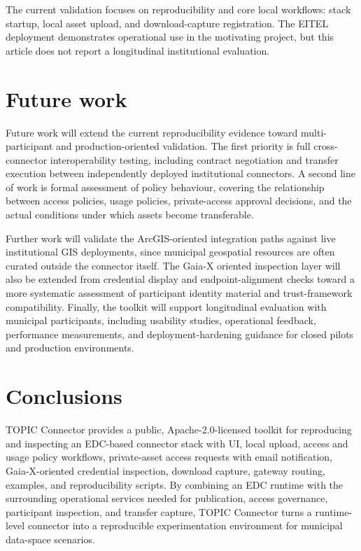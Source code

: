 \documentclass[a4paper,fleqn]{cas-dc}
\begin{document}
The current validation focuses on reproducibility and core local workflows: stack startup, local asset upload, and download-capture registration. The EITEL deployment demonstrates operational use in the motivating project, but this article does not report a longitudinal institutional evaluation.

\section{Future work}
Future work will extend the current reproducibility evidence toward multi-participant and production-oriented validation. The first priority is full cross-connector interoperability testing, including contract negotiation and transfer execution between independently deployed institutional connectors. A second line of work is formal assessment of policy behaviour, covering the relationship between access policies, usage policies, private-access approval decisions, and the actual conditions under which assets become transferable.

Further work will validate the ArcGIS-oriented integration paths against live institutional GIS deployments, since municipal geospatial resources are often curated outside the connector itself. The Gaia-X oriented inspection layer will also be extended from credential display and endpoint-alignment checks toward a more systematic assessment of participant identity material and trust-framework compatibility. Finally, the toolkit will support longitudinal evaluation with municipal participants, including usability studies, operational feedback, performance measurements, and deployment-hardening guidance for closed pilots and production environments.

\section{Conclusions}
TOPIC Connector provides a public, Apache-2.0-licensed toolkit for reproducing and inspecting an EDC-based connector stack with UI, local upload, access and usage policy workflows, private-asset access requests with email notification, Gaia-X-oriented credential inspection, download capture, gateway routing, examples, and reproducibility scripts. By combining an EDC runtime with the surrounding operational services needed for publication, access governance, participant inspection, and transfer capture, TOPIC Connector turns a runtime-level connector into a reproducible experimentation environment for municipal data-space scenarios.
\end{document}
